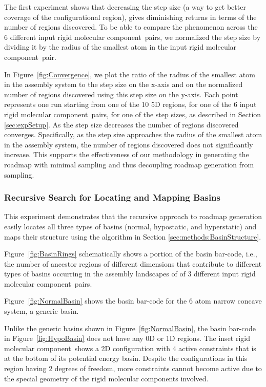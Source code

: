 \documentclass[]{article}
\newcommand{\figref}[1]{Figure~\ref{#1}}
\newcommand{\rmc}{rigid molecular component}
\begin{document}
The first experiment shows that decreasing the step size (a way to get better 
coverage of the configurational region), gives diminishing returns in terms of
the number of regions discovered. To be able to compare the phenomenon
across the 6 different input \rmc\ pairs, we normalized the step size by dividing
it by the radius of the smallest atom in the input \rmc\ pair.



In \figref{fig:Convergence}, we plot the ratio of the radius of the smallest
atom in the assembly system to the step size on the x-axis and on the
normalized number of regions discovered using this step size on the y-axis.
Each point represents one run starting from one of the 10 5D regions, for one
of the 6 input \rmc\ pairs, for one of the step sizes, as described in Section
\ref{sec:expSetup}. As the step size decreases the number of regions discovered
converges. Specifically, as the step size approaches the radius of the smallest
atom in the assembly system, the number of regions discovered does not
significantly increase. This supports the effectiveness of our methodology in
generating the roadmap with minimal sampling and thus decoupling roadmap
generation from sampling. 


\subsubsection{Recursive Search for Locating and Mapping Basins}
\label{sec:results:potentialEnergy}
This experiment demonstrates that the recursive approach to roadmap generation
easily locates all three types of basins (normal, hypostatic, and hyperstatic)
and maps their structure using the algorithm in Section
\ref{sec:methods:BasinStructure}.

\figref{fig:BasinRings} schematically shows a portion of the basin bar-code, i.e.,
the number of ancestor regions of different dimensions that contribute to different
types of basins occurring in the assembly landscapes of 
of 3 different input \rmc\ pairs.

\figref{fig:NormalBasin} shows the basin bar-code for the 6 atom narrow concave
system, a generic basin.

Unlike the generic basins shown in \figref{fig:NormalBasin}, the basin bar-code
in \figref{fig:HypoBasin} does not have any 0D or 1D regions. The inset
\rmc\ shows a 2D configuration with 4 active constraints that is at the
bottom of its potential energy basin. Despite the configurations in this region
having 2 degrees of freedom, more constraints cannot become active due to the
special geometry of the \rmc s involved. 
\end{document}
